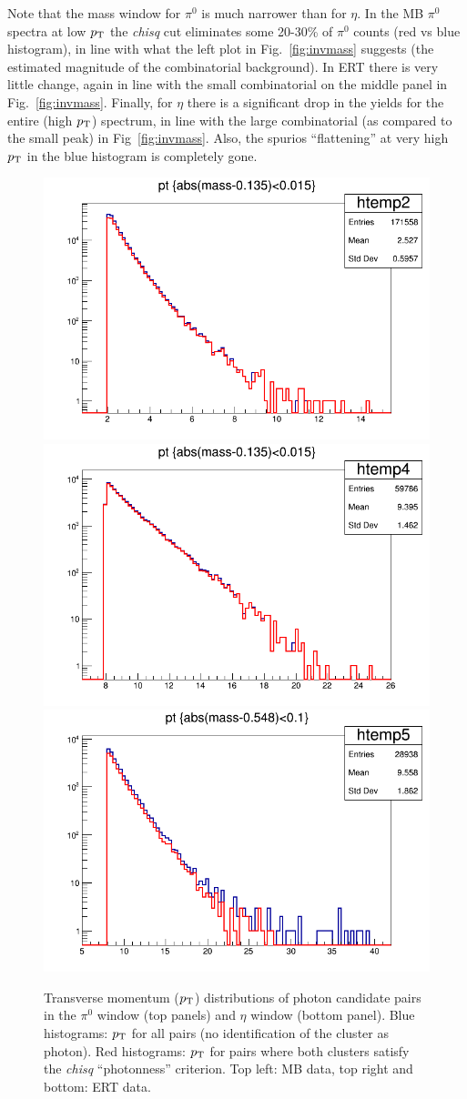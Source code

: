 \documentclass[12pt,letterpaper,aps,prc,superscriptaddress,showpacs,
longbibliography,nofootinbib,floatfix,onecolumn]{revtex4-1}
\newcommand{\pt}{\mbox{$p_{\rm T}$}\xspace}
\newcommand{\piz}{\mbox{$\pi^0$}\xspace}
\begin{document}
Note that the mass window for \piz is much narrower than for $\eta$.
In the MB \piz spectra at low \pt the {\it chisq} cut eliminates 
some 20-30\% of \piz counts (red vs blue histogram), in line with what
the left plot in Fig.~\ref{fig:invmass} suggests (the estimated
magnitude of the combinatorial background).  In ERT there is very
little change, again in line with the small combinatorial on the
middle panel in Fig.~\ref{fig:invmass}.  Finally, for $\eta$ there is
a significant drop in the yields for the entire (high \pt) spectrum,
in line with the large combinatorial (as compared to the small peak)
in Fig~\ref{fig:invmass}.  Also, the spurios ``flattening'' at very
high \pt in the blue histogram is completely gone.


\begin{center}
\begin{figure}[htbp]
  \includegraphics[width=0.45\linewidth]{figs/mbpi0pt.png}
  \includegraphics[width=0.45\linewidth]{figs/ertpi0pt.png}
  \includegraphics[width=0.45\linewidth]{figs/ertetapt.png}
  \caption{Transverse momentum (\pt) distributions of photon candidate
    pairs in the \piz window (top panels) and $\eta$ window (bottom
    panel).  Blue histograms: \pt for all pairs (no identification of
    the cluster as photon).  Red histograms: \pt for pairs where both
    clusters satisfy the {\it chisq} ``photonness'' criterion.
    Top left: MB data, top right and bottom: ERT data.
  }
    \label{fig:pizeta_pt}
\end{figure}
\end{center}
\end{document}
